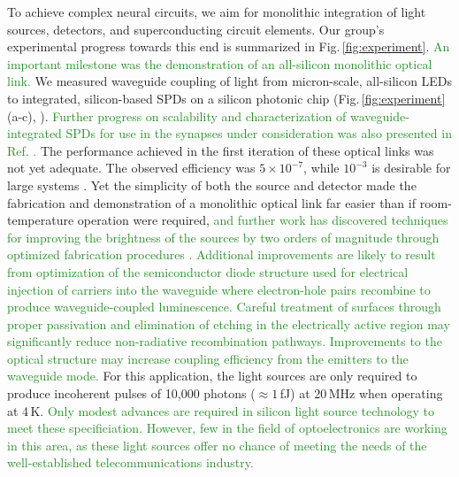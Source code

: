 \documentclass{article}
\newcommand{\onlinecite}[1]{\hspace{-1 ex} \nocite{#1}\citenum{#1}}
\begin{document}
\begin{multicols}{2}
\begin{figure}[tb]
\end{figure}
To achieve complex neural circuits, we aim for monolithic integration of light sources, detectors, and superconducting circuit elements. Our group's experimental progress towards this end is summarized in Fig.\,\ref{fig:experiment}. \textcolor{ForestGreen}{An important milestone was the demonstration of an all-silicon monolithic optical link.} We measured waveguide coupling of light from micron-scale, all-silicon LEDs to integrated, silicon-based SPDs on a silicon photonic chip (Fig.\,\ref{fig:experiment}(a-c), \cite{buch2017}). \textcolor{ForestGreen}{Further progress on scalability and characterization of waveguide-integrated SPDs for use in the synapses under consideration was also presented in Ref. \onlinecite{buta2020_2}.} The performance achieved in the first iteration of these optical links was not yet adequate. The observed efficiency was $5\times10^{-7}$, while $10^{-3}$ is desirable for large systems \cite{sh2019}. Yet the simplicity of both the source and detector made the fabrication and demonstration of a monolithic optical link far easier than if room-temperature operation were required, \textcolor{ForestGreen}{and further work has discovered techniques for improving the brightness of the sources by two orders of magnitude through optimized fabrication procedures \cite{buta2020}. Additional improvements are likely to result from optimization of the semiconductor diode structure used for electrical injection of carriers into the waveguide where electron-hole pairs recombine to produce waveguide-coupled luminescence. Careful treatment of surfaces through proper passivation and elimination of etching in the electrically active region may significantly reduce non-radiative recombination pathways. Improvements to the optical structure may increase coupling efficiency from the emitters to the waveguide mode.} For this application, the light sources are only required to produce incoherent pulses of 10,000 photons ($\approx 1$\,fJ) at 20\,MHz when operating at 4\,K. \textcolor{ForestGreen}{Only modest advances are required in silicon light source technology to meet these specificiation. However, few in the field of optoelectronics are working in this area, as these light sources offer no chance of meeting the needs of the well-established telecommunications industry.}


\end{multicols}
\end{document}
